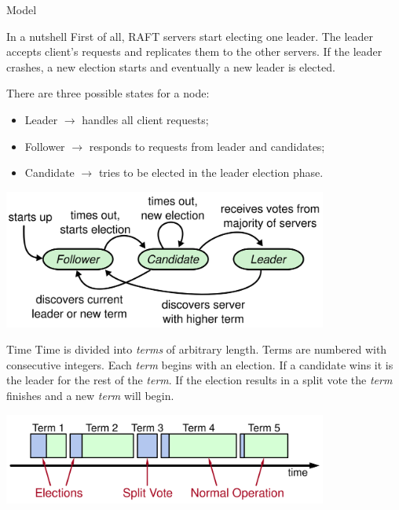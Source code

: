 \documentclass[presentation]{beamer}\mode<presentation>{\usetheme{AMSBolognaFC}}
\begin{document}
\begin{frame}[allowframebreaks]{Model}
    
    \begin{block}{In a nutshell}
        First of all, RAFT servers start electing one leader.
        The leader accepts client's requests and replicates them to the other servers.
        If the leader crashes, a new election starts and eventually a new leader is elected.
    \end{block}
    
    \framebreak
    
    There are three possible states for a node:
    \begin{itemize}
        \item Leader  $\rightarrow$ handles all client requests;
        \item Follower $\rightarrow$ responds to requests from leader and candidates;
        \item Candidate $\rightarrow$ tries to be elected in the leader election phase.
    \end{itemize}

    \centering
    \includegraphics[width=0.8\textwidth]{figures/node-state-diagram.png}
    
    \framebreak
    
     \begin{block}{Time}
        Time is divided into \emph{terms} of arbitrary length.
        Terms are numbered with consecutive integers.
        Each \emph{term} begins with an election.
        If a candidate wins it is the leader for the rest of the \emph{term}.
        If the election results in a split vote the \emph{term} finishes and a new \emph{term} will begin.
    \end{block}

    \centering
    \includegraphics[width=0.8\textwidth]{figures/time.png}
    

\end{frame}
\end{document}
